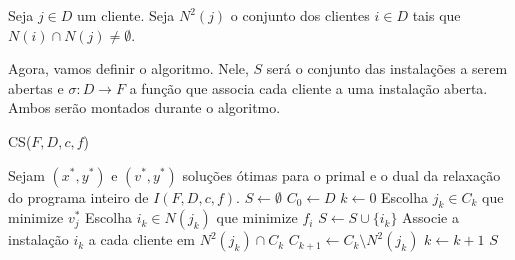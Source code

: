 \begin{definition}
    Seja $j\in D$ um cliente. Seja $N^2(j)$ o conjunto dos clientes $i \in D$ tais que $N(i) \cap N(j) \neq \emptyset$.
\end{definition}
Agora, vamos definir o algoritmo. Nele, $S$ será o conjunto das instalações a serem abertas e $\sigma : D \rightarrow F $ a função que associa cada cliente a uma instalação aberta. Ambos serão montados durante o algoritmo.
\begin{algorithm}
    \caption{CS($F,D,c,f$)}
    \label{fl:plrounding}
    \begin{algorithmic}[1]
        \State Sejam $(x^*,y^*)$ e $(v^*,y^*)$ soluções ótimas para o primal e o dual da relaxação do programa inteiro de $I(F,D,c,f)$.
        \State $S \gets \emptyset$
        \State $C_0 \gets D$ 
        \State $k \gets 0$
        \State Escolha $j_k \in C_k$ que minimize $v_j^*$
        \State Escolha $i_k \in N(j_k)$ que minimize $f_{i}$
        \State $S \gets S \cup \{i_k\}$
        \State Associe a instalação $i_k$ a cada cliente em $N^2(j_k) \cap C_k$
        \State $C_{k+1} \gets C_k \setminus N^2(j_k)$
        \State $k \gets k+1$
        \EndWhile
        \State \Return $S$
    \end{algorithmic}
\end{algorithm}

